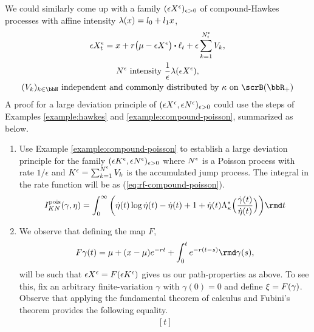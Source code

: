 \begin{example}
  \label{example:compound-hawkes}
  We could similarly come up with a family $(\epsilon X^\epsilon)_{\epsilon>0}$ of compound-Hawkes processes with affine intensity $\lambda(x) = l_0 + l_1 x$,
  \begin{gather*}
    \Xe_t = \stateVar + \hawkesRate\big(\mu - \Xe\big) \shortInt \leb_t + \epsilon \sum_{k=1}^{N^\epsilon_t} \V_k, \\
    \N^\epsilon \text{ intensity } \frac1\epsilon\affInt(\Xe), \\
    (\V_k)_{k\in\bbN} \text{ independent and commonly distributed by } \affDist \text{ on } \scrB(\bbR_+)
  \end{gather*}
  A proof for a large deviation principle of $(\epsilon X^\epsilon, \epsilon N^\epsilon)_{\epsilon>0}$ could use the steps of Examples \ref{example:hawkes} and \ref{example:compound-poisson}, summarized as below.
  \begin{enumerate}
    \item
      Use Example \ref{example:compound-poisson} to establish a large deviation principle for the family $(\epsilon K^\epsilon, \epsilon N^\epsilon)_{\epsilon>0}$ where $N^\epsilon$ is a Poisson process with rate $1/\epsilon$ and $K^\epsilon = \sum_{k=1}^{N^\epsilon} V_k$ is the accumulated jump process.
      The integral in the rate function will be as (\ref{eq:rf-compound-poisson}).
      \begin{equation*}
        \rf_{K\N}^\text{pois}(\gamma, \eta) = \int_0^\infty \bigg( \dot\eta(t) \log \dot\eta(t) - \dot\eta(t) + 1 + \dot\eta(t) \ode_\affDist^*\Big(\frac{\dot\gamma(t)}{\dot\eta(t)} \Big) \bigg) \rmd t
      \end{equation*}
    \item
      We observe that defining the map $F$,
      \begin{equation*}
        F\gamma(t) = \mu + (\stateVar - \mu)e^{-\hawkesRate t} + \int_0^t e^{-\hawkesRate(t-s)} \rmd\gamma(s),
      \end{equation*}
      will be such that $\epsilon X^\epsilon = F(\epsilon K^\epsilon)$ gives us our path-properties as above.
      To see this, fix an arbitrary finite-variation $\gamma$ with $\gamma(0) = 0$ and define $\xi = F(\gamma)$.
      Observe that applying the fundamental theorem of calculus and Fubini's theorem provides the following equality.
      \begin{equation}
        \label{eq:most-annoying-thing-ever}
        \begin{aligned}[t]

\end{aligned}
\end{equation}
\end{enumerate}
\end{example}
